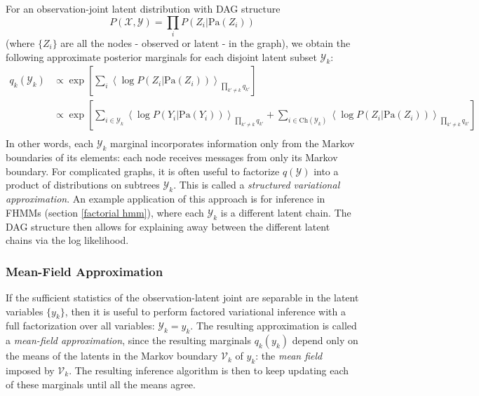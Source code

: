 \documentclass[a4paper]{article}
\begin{document}
For an observation-joint latent distribution with DAG structure
\[ P(\mathcal{X},\mathcal{Y}) = \prod_i P(Z_i|\textrm{Pa}(Z_i)) \]
(where $\{Z_i\}$ are all the nodes - observed or latent - in the graph), we obtain the following approximate posterior marginals for each disjoint latent subset $\mathcal{Y}_k$:
\begin{align*}
q_k(\mathcal{Y}_k) &\propto \exp\left[\sum_i \left\langle \log P(Z_i|\textrm{Pa}(Z_i))\right\rangle_{\prod_{k'\neq k}q_{k'}} \right] \\
&\propto \exp\left[\sum_{i\in \mathcal{Y}_k} \left\langle\log P(Y_i|\textrm{Pa}(Y_i))\right\rangle_{\prod_{k'\neq k}q_{k'}} + \sum_{i\in \textrm{Ch}(\mathcal{Y}_k)} \left\langle \log P(Z_i|\textrm{Pa}(Z_i))\right\rangle_{\prod_{k'\neq k}q_{k'}} \right] \\
\end{align*}
In other words, each $\mathcal{Y}_k$ marginal incorporates information only from the Markov boundaries of its elements: each node receives messages from only its Markov boundary. For complicated graphs, it is often useful to factorize $q(\mathcal{Y})$ into a product of distributions on subtrees $\mathcal{Y}_k$. This is called a \emph{structured variational approximation}. An example application of this approach is for inference in FHMMs (section \ref{factorial hmm}), where each $\mathcal{Y}_k$ is a different latent chain. The DAG structure then allows for explaining away between the different latent chains via the log likelihood. 

\subsubsection{Mean-Field Approximation}
If the sufficient statistics of the observation-latent joint are separable in the latent variables $\{y_k\}$, then it is useful to perform factored variational inference with a full factorization over all variables: $\mathcal{Y}_k = y_k$. The resulting approximation is called a \emph{mean-field approximation}, since the resulting marginals $q_k(y_k)$ depend only on the means of the latents in the Markov boundary $\mathcal{V}_k$ of $y_k$: the \emph{mean field} imposed by $\mathcal{V}_k$. The resulting inference algorithm is then to keep updating each of these marginals until all the means agree.
\end{document}
